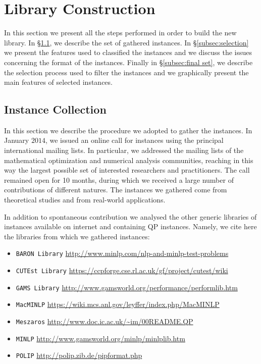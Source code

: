 \section{Library Construction}\label{sec:lib}




In this section we present all the steps performed in order to build
the new library. In \S \ref{subsec:instColl}, we describe the set of gathered
instances. In \S \ref{subsec:selection}
we present the features used to classified the instances and 
we discuss the issues concerning the format of the instances. Finally in \S \ref{subsec:final set}, we describe the selection process
used to filter the instances and we graphically present the main features of selected instances.

\subsection{Instance Collection}\label{subsec:instColl}

In this section we describe the procedure we adopted to gather the
instances. In January $2014$, we issued an online call for instances
using the principal international mailing lists.
In particular, we addressed the mailing lists of the mathematical
optimization and numerical analysis communities, reaching in this way
the largest possible set of interested researchers and practitioners.
The call remained open for 10 months, during which we received a large
number of contributions of different natures. The instances
we gathered come from theoretical studies and from real-world
applications.

In addition to spontaneous contribution we analysed the other generic
libraries of instances available  on internet and containing QP
instances. Namely, we cite here the libraries from which we gathered instances:

\begin{itemize}
 \item {\tt BARON Library}
\url{http://www.minlp.com/nlp-and-minlp-test-problems}
 \item {\tt CUTEst Library}
\url{https://ccpforge.cse.rl.ac.uk/gf/project/cutest/wiki}
 \item {\tt GAMS Library}
\url{http://www.gamsworld.org/performance/performlib.htm}
 \item {\tt MacMINLP} \url{https://wiki.mcs.anl.gov/leyffer/index.php/MacMINLP}
 \item {\tt Meszaros} \url{http://www.doc.ic.ac.uk/~im/00README.QP}
 \item {\tt MINLP} \url{http://www.gamsworld.org/minlp/minlplib.htm}
 \item {\tt POLIP} \url{http://polip.zib.de/pipformat.php}
\end{itemize}

